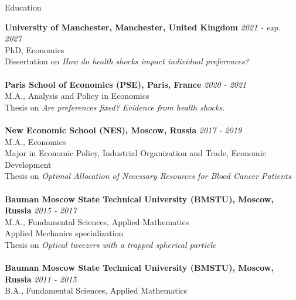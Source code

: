 \documentclass{resume} %
\begin{document}

\begin{rSection}{Education}

{\bf University of Manchester, Manchester, United Kingdom} \hfill {\em 2021 - exp. 2027} 
\\ PhD, Economics\\
Dissertation on \textit{How do health shocks impact individual preferences?} \smallskip \\
\\{\bf Paris School of Economics (PSE), Paris, France} \hfill {\em 2020 - 2021} 
\\ M.A., Analysis and Policy in Economics\\
Thesis on \textit{Are preferences fixed? Evidence from health
shocks.} \smallskip \\
\\{\bf New Economic School (NES), Moscow, Russia} \hfill {\em 2017 - 2019} 
\\ M.A., Economics\\
Major in Economic Policy, Industrial Organization and Trade, Economic Development \smallskip \\
Thesis on \textit{Optimal Allocation of Necessary Resources for Blood Cancer Patients} \smallskip \\
\\{\bf Bauman Moscow State Technical University (BMSTU), Moscow, Russia} \hfill {\em 2015 - 2017} 
\\ M.A., Fundamental Sciences, Applied Mathematics \\
Applied Mechanics specialization \smallskip \\
Thesis on \textit{Optical tweezers with a trapped spherical particle} \smallskip \\
\\{\bf Bauman Moscow State Technical University (BMSTU), Moscow, Russia} \hfill {\em 2011 - 2015} 
\\ B.A., Fundamental Sciences, Applied Mathematics


\end{rSection}
\end{document}
